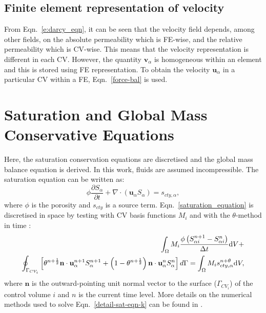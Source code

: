 \subsection{Finite element representation of velocity}\label{ChapterMultiFluidsModel:Section:Force_density}
From Eqn.~\ref{e:darcy_eqn}, it can be seen that the velocity field depends, among other fields, on the absolute permeability which is FE-wise, and the relative permeability which is CV-wise. This means that the velocity representation is different in each CV. However, the quantity $\mathbf{v}_\alpha$ is homogeneous within an element and this is stored using FE representation. To obtain the velocity $\mathbf{u}_{\alpha}$ in a particular CV within a FE, Eqn.~\ref{force-bal} is used.


\section{Saturation and Global Mass Conservative Equations} \label{ChapterMultiFluidsModel:Section:Saturation_Global}
Here, the saturation conservation equations are discretised and the global mass balance equation is derived. In this work, fluids are assumed incompressible. The saturation equation can be written as:
\begin{equation}
  \phi\displaystyle\frac{\partial S_{\alpha} }{\partial t} + \nabla \cdot \left( {\mathbf u}_{\alpha} S_{\alpha}\right) = s_{cty,\alpha}, \label{saturation_equation}
\end{equation}
where $\phi$ is the porosity and $s_{cty}$ is a source term. Eqn.~\ref{saturation_equation} is discretised in space by testing with CV basis functions $M_{i}$ and with the $\theta$-method in time \citep[see][]{gomes_book_2012}:
\begin{eqnarray}
     \int_{\Omega} M_{i} \displaystyle\frac{\phi \left({S_{\alpha i}^{n+1}}-{S_{\alpha i}^{n}}\right)}{\Delta t} \mathrm{d} V + \nonumber  \\ 
     \oint_{\Gamma_{CV_{i}}} \left[\theta^{n+\frac{1}{2}} {\mathbf n}  \cdot {\mathbf u}_{\alpha}^{n+1} S_{\alpha}^{n+1} + \left(1-\theta^{n+\frac{1}{2}}\right) {\mathbf n} \cdot {\mathbf u}_{\alpha}^{n} S_{\alpha}^{n} \right]d\Gamma = \int_{\Omega}  M_{i} {s_{cty,\alpha}^{n+\theta}} \mathrm{d} V, \label{detail-sat-eqn-k}
\end{eqnarray}
where $\mathbf{n}$ is the outward-pointing unit normal vector to the surface ($\Gamma_{CV_{i}}$) of the control volume $i$ and $n$ is the current time level. More details on the numerical methods used to solve Eqn.~\ref{detail-sat-eqn-k} can be found in \citet{pavlidis_2016}.

